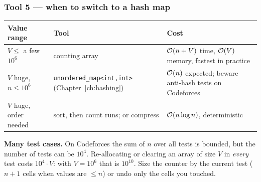 \begin{diagrambox}
\end{diagrambox}

\subsubsection*{Tool 5 --- when to switch to a hash map}

\begin{table}[H]
\centering\small
\renewcommand{\arraystretch}{1.2}
\begin{tabularx}{\linewidth}{@{}>{\raggedright\arraybackslash}p{3.6cm} >{\raggedright\arraybackslash}p{4.4cm} X@{}}
\toprule
\textbf{Value range} & \textbf{Tool} & \textbf{Cost} \\
\midrule
$V \le$ a few $10^6$ & counting array & $\mathcal{O}(n + V)$ time, $\mathcal{O}(V)$ memory, fastest in practice \\
$V$ huge, $n \le 10^6$ & \texttt{unordered\_map<int,int>} (Chapter~\ref{ch:hashing}) & $\mathcal{O}(n)$ expected; beware anti-hash tests on Codeforces \\
$V$ huge, order needed & sort, then count runs; or compress & $\mathcal{O}(n \log n)$, deterministic \\
\bottomrule
\end{tabularx}
\end{table}

\textbf{Many test cases.} On Codeforces the sum of $n$ over all tests is bounded, but the number of tests can be $10^4$. Re-allocating or clearing an array of size $V$ in \emph{every} test costs $10^4 \cdot V$: with $V = 10^6$ that is $10^{10}$. Size the counter by the current test ($n + 1$ cells when values are $\le n$) or undo only the cells you touched.

